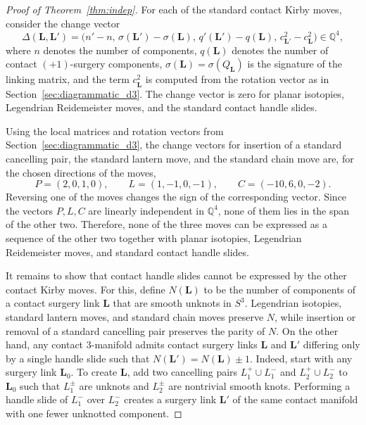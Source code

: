 \documentclass{amsart}
\numberwithin{equation}{section}
\numberwithin{figure}{section}
\theoremstyle{definition}
\theoremstyle{remark}
\let\oldDelta\Delta
\renewcommand{\Delta}{\oldDelta} %
\begin{document}
\begin{proof}[Proof of Theorem~\ref{thm:indep}] For each of the standard contact Kirby moves, consider the change vector
\[
\Delta(\boldsymbol L,\boldsymbol L')
=
\bigl(
n'-n,\,
\sigma(\boldsymbol L')-\sigma(\boldsymbol L),\,
q'(\boldsymbol L')-q(\boldsymbol L),\,
c_{\boldsymbol L'}^2-c_{\boldsymbol L}^2
\bigr)
\in\mathbb Q^4,
\]
where \(n\) denotes the number of components, \(q(\boldsymbol L)\) denotes the number of contact \((+1)\)-surgery components, $\sigma(\boldsymbol L)=\sigma(Q_{\boldsymbol L})$ is the signature of the linking matrix, and the term \(c_{\boldsymbol L}^2\) is computed from the rotation vector as in Section~\ref{sec:diagrammatic_d3}. The change vector is zero for planar isotopies, Legendrian Reidemeister moves, and the standard contact handle slides.

Using the local matrices and rotation vectors from Section~\ref{sec:diagrammatic_d3}, the change vectors for insertion of a standard cancelling pair, the standard lantern move, and the standard chain move are, for the chosen directions of the moves,
\[
P=(2,0,1,0),\qquad
L=(1,-1,0,-1),\qquad
C=(-10,6,0,-2).
\]
Reversing one of the moves changes the sign of the corresponding vector. Since the vectors \(P,L,C\) are linearly independent in \(\mathbb Q^4\), none of them lies in the span of the other two. Therefore, none of the three moves can be expressed as a sequence of the other two together with planar isotopies, Legendrian Reidemeister moves, and standard contact handle slides.

It remains to show that contact handle slides cannot be expressed by the other contact Kirby moves. For this, define $N(\boldsymbol{L})$ to be the number of components of a contact surgery link $\boldsymbol{L}$ that are smooth unknots in $S^3$. Legendrian isotopies, standard lantern moves, and standard chain moves preserve $N$, while insertion or removal of a standard cancelling pair preserves the parity of $N$. On the other hand, any contact $3$-manifold admits contact surgery links $\boldsymbol{L}$ and $\boldsymbol{L}'$ differing only by a single handle slide such that $N(\boldsymbol{L}')=N(\boldsymbol{L})\pm1$. Indeed, start with any surgery link $\boldsymbol{L}_0$. To create $\boldsymbol{L}$, add two cancelling pairs $L_1^+\cup L_1^-$ and $L_2^+\cup L_2^-$ to $\boldsymbol{L}_0$ such that $L_1^{\pm}$ are unknots and $L_2^{\pm}$ are nontrivial smooth knots. Performing a handle slide of $L_1^-$ over $L_2^-$ creates a surgery link $\boldsymbol{L}'$ of the same contact manifold with one fewer unknotted component.
\end{proof}
\end{document}
